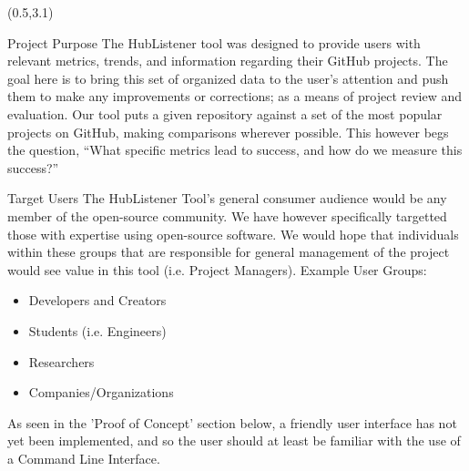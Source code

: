 \documentclass[22pt]{beamer}
\begin{document}
\begin{frame}[fragile]
\begin{textblock}{7.25}(0.5,3.1)
\begin{block}{Project Purpose}
The HubListener tool was designed to provide users with relevant metrics, trends, and information regarding their GitHub projects. The goal here is to bring this set of organized data to the user’s attention and push them to make any improvements or corrections; as a means of project review and evaluation. Our tool puts a given repository against a set of the most popular projects on GitHub, making comparisons wherever possible. This however begs the question, “What specific metrics lead to success, and how do we measure this success?”
\end{block}

\begin{block}{Target Users}
The HubListener Tool's general consumer audience would be any member of the open-source community. We have however specifically targetted those with expertise using open-source software. We would hope that individuals within these groups that are responsible for general management of the project would see value in this tool (i.e. Project Managers). \newline
\newline
Example User Groups:
\begin{itemize}
\item Developers and Creators 
\item Students (i.e. Engineers)
\item Researchers
\item Companies/Organizations \newline
\end{itemize}
As seen in the 'Proof of Concept' section below, a friendly user interface has not yet been implemented, and so the user should at least be familiar with the use of a Command Line Interface. 
\end{block}


\end{textblock}
\end{frame}
\end{document}
